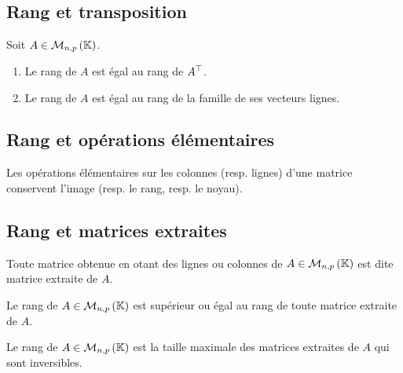 \subsection{Rang et transposition}
\begin{defprop}
    Soit \(A \in \M{n,p}\).
    \begin{enumerate}
        \item Le rang de \(A\) est égal au rang de \(A^{\top}\).
        \item Le rang de \(A\) est égal au rang de la famille de ses vecteurs lignes.
    \end{enumerate}
\end{defprop}
\subsection{Rang et opérations élémentaires}
\begin{defprop}
    Les opérations élémentaires sur les colonnes (resp. lignes) d’une matrice conservent l’image (resp. le rang, resp. le noyau).
\end{defprop}
\subsection{Rang et matrices extraites}
\begin{defi}
    Toute matrice obtenue en otant des lignes ou colonnes de \(A \in \M{n,p}\) est dite matrice extraite de \(A\).
\end{defi}
\begin{prop}
    Le rang de \(A \in \M{n,p}\) est supérieur ou égal au rang de toute matrice extraite de \(A\).
\end{prop}
\begin{defprop}
Le rang de \(A \in \M{n,p}\) est la taille maximale des matrices extraites de \(A\) qui sont inversibles.
\end{defprop}